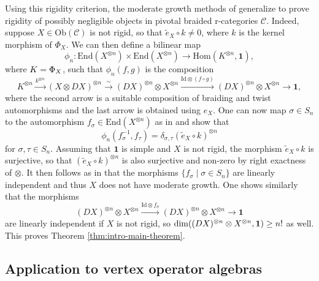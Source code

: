 \documentclass[11pt, reqno]{amsart}
\theoremstyle{definition}\newtheorem{defi}[thm]{Definition}
\theoremstyle{definition}\newtheorem{rem}[thm]{Remark}
\theoremstyle{definition}\newtheorem{exam}[thm]{Example}
\theoremstyle{definition}\newtheorem{assum}[thm]{Assumption}
\newcommand{\cC}{\mathcal{C}}
\newcommand{\til}{\widetilde}
\newcommand{\Id}{\mathrm{Id}}
\newcommand{\vac}{\mathbf{1}}
\let\ker\relax
\let\hom\relax
\DeclareMathOperator{\ker}{Ker}
\DeclareMathOperator{\hom}{Hom}
\begin{document}
Using this rigidity criterion, the moderate growth methods of \cite{EP} generalize to prove rigidity of possibly negligible objects in pivotal braided r-categories $\cC$. Indeed, suppose $X\in\mathrm{Ob}(\cC)$ is not rigid, so that $\til{e}_X\circ k\neq 0$, where $k$ is the kernel morphism of $\Phi_X$. We can then define a bilinear map
\begin{equation*}
\phi_n: \mathrm{End}(X^{\otimes n})\times\mathrm{End}(X^{\otimes n})\longrightarrow\mathrm{Hom}(K^{\otimes n},\vac),
\end{equation*}
where $K=\ker\Phi_X$,
such that $\phi_n(f,g)$ is the composition
\begin{equation*}
K^{\otimes n} \xrightarrow{k^{\otimes n}} (X\otimes DX)^{\otimes n} \xrightarrow{\sim} (DX)^{\otimes n}\otimes X^{\otimes n}\xrightarrow{\Id\otimes (f\circ g)} (DX)^{\otimes n}\otimes X^{\otimes n}\longrightarrow\vac,
\end{equation*}
where the second arrow is a suitable composition of braiding and twist automorphisms and the last arrow is obtained using $e_X$. One can now map $\sigma\in S_n$ to the automorphism $f_\sigma\in\mathrm{End}(X^{\otimes n})$ as in \cite{EP} and show that
\begin{equation*}
\phi_n(f_\sigma^{-1},f_\tau) =\delta_{\sigma,\tau} (\til{e}_X\circ k)^{\otimes n}
\end{equation*}
for $\sigma,\tau\in S_n$. Assuming that $\vac$ is simple and $X$ is not rigid, the morphism $\til{e}_X\circ k$ is surjective, so that $(\til{e}_X\circ k)^{\otimes n}$ is also surjective and non-zero by right exactness of $\otimes$. It then follows as in \cite{EP} that the morphisms $\lbrace f_\sigma\mid \sigma\in S_n\rbrace $ are linearly independent and thus $X$ does not have moderate growth. One shows similarly that the morphisms
\begin{equation*}
(DX)^{\otimes n}\otimes X^{\otimes n} \xrightarrow{\Id\otimes f_\sigma} (DX)^{\otimes n}\otimes X^{\otimes n} \longrightarrow\vac
\end{equation*}
are linearly independent if $X$ is not rigid, so $\dim\hom((DX)^{\otimes n}\otimes X^{\otimes n},\vac)\geq n!$ as well. This proves Theorem \ref{thm:intro-main-theorem}.





\subsection{Application to vertex operator algebras}
\end{document}
